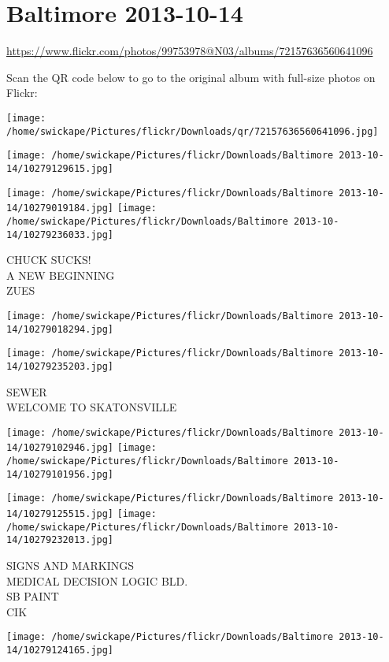 \documentclass[10pt,letterpaper]{article}
\title{}
\author{}
\date{}
\begin{document}
\section*{Baltimore 2013-10-14}

\url{https://www.flickr.com/photos/99753978@N03/albums/72157636560641096}

Scan the QR code below to go to the original album with full-size photos on Flickr:

\texttt{[image: /home/swickape/Pictures/flickr/Downloads/qr/72157636560641096.jpg]}
\pagebreak

\texttt{[image: /home/swickape/Pictures/flickr/Downloads/Baltimore 2013-10-14/10279129615.jpg]}

\vspace{0.25in}
\texttt{[image: /home/swickape/Pictures/flickr/Downloads/Baltimore 2013-10-14/10279019184.jpg]}
\texttt{[image: /home/swickape/Pictures/flickr/Downloads/Baltimore 2013-10-14/10279236033.jpg]}

CHUCK SUCKS!\\
A NEW BEGINNING\\
ZUES
\pagebreak

\texttt{[image: /home/swickape/Pictures/flickr/Downloads/Baltimore 2013-10-14/10279018294.jpg]}

\vspace{0.25in}
\texttt{[image: /home/swickape/Pictures/flickr/Downloads/Baltimore 2013-10-14/10279235203.jpg]}

SEWER\\
WELCOME TO SKATONSVILLE
\pagebreak

\texttt{[image: /home/swickape/Pictures/flickr/Downloads/Baltimore 2013-10-14/10279102946.jpg]}
\texttt{[image: /home/swickape/Pictures/flickr/Downloads/Baltimore 2013-10-14/10279101956.jpg]}

\texttt{[image: /home/swickape/Pictures/flickr/Downloads/Baltimore 2013-10-14/10279125515.jpg]}
\texttt{[image: /home/swickape/Pictures/flickr/Downloads/Baltimore 2013-10-14/10279232013.jpg]}

SIGNS AND MARKINGS\\
MEDICAL DECISION LOGIC BLD.\\
SB PAINT\\
CIK
\pagebreak

\texttt{[image: /home/swickape/Pictures/flickr/Downloads/Baltimore 2013-10-14/10279124165.jpg]}
\end{document}
